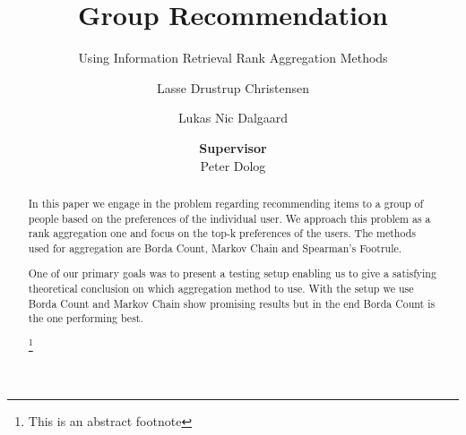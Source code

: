 \documentclass[sigplan]{acmart}
\begin{document}
\title{Group Recommendation}
\subtitle{Using Information Retrieval Rank Aggregation Methods}

\author{Lasse Drustrup Christensen}

\author{Lukas Nic Dalgaard}

\author{\textbf{Supervisor}\\ Peter Dolog}



\begin{abstract}
In this paper we engage in the problem regarding recommending items to a group of people based on the preferences of the individual user. We approach this problem as a rank aggregation one and focus on the top-k preferences of the users.
The methods used for aggregation are Borda Count, Markov Chain and Spearman's Footrule. 

One of our primary goals was to present a testing setup enabling us to give a satisfying theoretical conclusion on which aggregation method to use. With the setup we use Borda Count and Markov Chain show promising results but in the end Borda Count is the one performing best.

\footnote{This is an abstract footnote}
\end{abstract}




\maketitle









 


\end{document}
